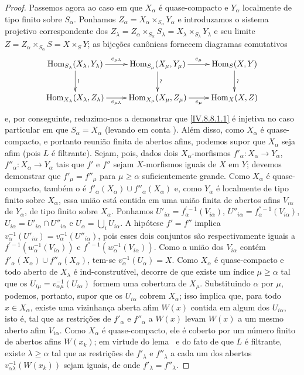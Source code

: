 \begin{proof}
Passemos agora ao caso em que $X_\alpha$ é quase-compacto e $Y_\alpha$ localmente de tipo finito sobre $S_\alpha$.
Ponhamos $Z_\alpha=X_\alpha\times_{S_\alpha}Y_\alpha$ e introduzamos o sistema projetivo correspondente dos $Z_\lambda=Z_\alpha\times_{S_\alpha}S_\lambda=X_\lambda\times_{S_\lambda}Y_\lambda$ e seu limite $Z=Z_\alpha\times_{S_\alpha}S=X\times_S Y$; as bijeções canônicas  fornecem diagramas comutativos
\[
\xymatrix{
  \operatorname{Hom}_{S_\lambda}(X_\lambda,Y_\lambda) \ar[r]^-{e_{\mu\lambda}} \ar[d]^{\wr} & \operatorname{Hom}_{S_\mu}(X_\mu,Y_\mu) \ar[r]^-{e_\mu} \ar[d]^{\wr} & \operatorname{Hom}_S(X,Y) \ar[d]^{\wr}\\
  \operatorname{Hom}_{X_\lambda}(X_\lambda,Z_\lambda) \ar[r]_-{e_{\mu\lambda}} & \operatorname{Hom}_{X_\mu}(X_\mu,Z_\mu) \ar[r]_-{e_\mu} & \operatorname{Hom}_X(X,Z)
}
\]
e, por conseguinte, reduzimo-nos a demonstrar que \eqref{IV.8.8.1.1} é injetiva no caso particular em que $S_\alpha=X_\alpha$ (levando em conta ).
Além disso, como $X_\alpha$ é quase-compacto, e portanto reunião finita de abertos afins, podemos supor que $X_\alpha$ seja afim (pois $L$ é filtrante). Sejam, pois, dados dois $X_\alpha$-morfismos $f'_\alpha:X_\alpha\to Y_\alpha$, $f''_\alpha:X_\alpha\to Y_\alpha$ tais que $f'$ e $f''$ sejam $X$-morfismos iguais de $X$ em $Y$; devemos demonstrar que $f'_\mu=f''_\mu$ para $\mu\geqslant\alpha$ suficientemente grande. Como $X_\alpha$ é quase-compacto, também o é $f'_\alpha(X_\alpha)\cup f''_\alpha(X_\alpha)$ e, como $Y_\alpha$ é localmente de tipo finito sobre $X_\alpha$, essa união está contida em uma união finita de abertos afins $V_{i\alpha}$ de $Y_\alpha$, de tipo finito sobre $X_\alpha$. Ponhamos $U'_{i\alpha}=f_\alpha^{'-1}(V_{i\alpha})$, $U''_{i\alpha}=f_\alpha^{''-1}(V_{i\alpha})$, $U_{i\alpha}=U'_{i\alpha}\cap U''_{i\alpha}$ e $U_\alpha=\bigcup_iU_{i\alpha}$. A hipótese $f'=f''$ implica $v_\alpha^{-1}(U'_{i\alpha})=v_\alpha^{-1}(U''_{i\alpha})$, pois esses dois conjuntos são respectivamente iguais a $f^{'-1}(w_\alpha^{-1}(V_{i\alpha}))$ e $f^{''-1}(w_\alpha^{-1}(V_{i\alpha}))$. Como a união dos $V_{i\alpha}$ contém $f'_\alpha(X_\alpha)\cup f''_\alpha(X_\alpha)$, tem-se $v_\alpha^{-1}(U_\alpha)=X$. Como $X_\alpha$ é quase-compacto e todo aberto de $X_\lambda$ é ind-construtível, decorre de  que existe um índice $\mu\geqslant\alpha$ tal que os $U_{i\mu}=v_{\alpha\mu}^{-1}(U_{i\alpha})$ formem uma cobertura de $X_\mu$. Substituindo $\alpha$ por $\mu$, podemos, portanto, supor que os $U_{i\alpha}$ cobrem $X_\alpha$; isso implica que, para todo $x\in X_\alpha$, existe uma vizinhança aberta afim $W(x)$ contida em algum dos $U_{i\alpha}$, isto é, tal que as restrições de $f'_\alpha$ e $f''_\alpha$ a $W(x)$ levam $W(x)$ a um mesmo aberto afim $V_{i\alpha}$. Como $X_\alpha$ é quase-compacto, ele é coberto por um número finito de abertos afins $W(x_k)$; em virtude do lema~ e do fato de que $L$ é filtrante, existe $\lambda\geqslant\alpha$ tal que as restrições de $f'_\lambda$ e $f''_\lambda$ a cada um dos abertos $v_{\alpha\lambda}^{-1}(W(x_k))$ sejam iguais, de onde $f'_\lambda=f''_\lambda$.


\end{proof}
